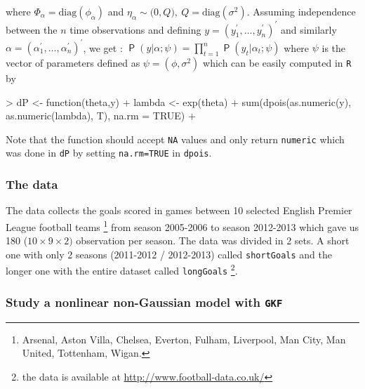 \documentclass{article}
\newcommand{\R}{\texttt{R}\xspace}
\newcommand{\GKF}{\texttt{GKF}\xspace}
\DeclareMathOperator{\Prob}{\mathsf{P}}
\begin{document}
where $\Phi_{\alpha} =\text{diag}(\phi_\alpha)$ and
$\eta_{\alpha} \sim \mathcal(0,Q), \ Q=\text{diag}(\sigma^2) $.  Assuming independence
between the $n$ time observations and defining $y=(y_1 ^\prime, \dots, y_n^\prime)^\prime$
and similarly $\alpha= (\alpha_1 ^\prime, \dots, \alpha_n^\prime)^\prime$, we get :
$ \Prob(y|\alpha;\psi)= \displaystyle \prod_{t=1}^n \Prob(y_t|\alpha_t;\psi)$ where $\psi$ is
the vector of parameters defined as $\psi=(\phi,\sigma^2)$ which can be easily computed in \R
by
\begin{Schunk}
\begin{Sinput}
> dP <- function(theta,y){
+     lambda <- exp(theta)
+     sum(dpois(as.numeric(y), as.numeric(lambda), T), na.rm = TRUE)
+ }
\end{Sinput}
\end{Schunk}
Note that the function should accept \texttt{NA} values and only return \texttt{numeric}
which was done in \texttt{dP} by setting \texttt{na.rm=TRUE} in \texttt{dpois}.

\subsubsection{The data}

The data collects the goals scored in games between 10 selected English Premier League
football teams \footnote{Arsenal, Aston Villa, Chelsea, Everton, Fulham, Liverpool, Man City,
  Man United, Tottenham, Wigan.} from season 2005-2006 to season 2012-2013 which gave us 180
($10 \times 9 \times 2)$ observation per season. The data was divided in 2 sets. A short one
with only 2 seasons (2011-2012 / 2012-2013) called \texttt{shortGoals} and the longer one
with the entire dataset called \texttt{longGoals} \footnote{the data is available at
  \url{http://www.football-data.co.uk/}}.

\subsubsection{Study a nonlinear non-Gaussian model with \GKF}
\end{document}
